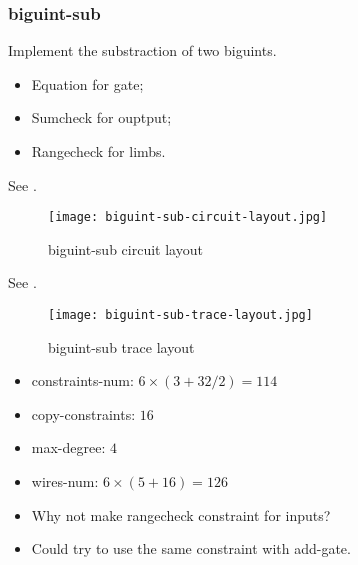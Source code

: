 \subsubsection{biguint-sub}

Implement the substraction of two biguints.

\begin{itemize}
    \item Equation for gate;
    \item Sumcheck for ouptput;
    \item Rangecheck for limbs.
\end{itemize}

See .
\begin{figure}[!ht]
    \centering
    \texttt{[image: biguint-sub-circuit-layout.jpg]}
    \caption{biguint-sub circuit layout}
    \label{fig:biguint-sub-circuit-layout}
\end{figure}

See .
\begin{figure}[!ht]
    \centering
    \texttt{[image: biguint-sub-trace-layout.jpg]}
    \caption{biguint-sub trace layout}
    \label{fig:biguint-sub-trace-layout}
\end{figure}

\begin{itemize}
    \item constraints-num: $6 \times (3 + 32 / 2) = 114$
    \item copy-constraints: $16$
    \item max-degree: $4$
    \item wires-num: $6 \times (5 + 16) = 126$
\end{itemize}

\begin{itemize}
    \item Why not make rangecheck constraint for inputs?
    \item Could try to use the same constraint with add-gate.
\end{itemize}
